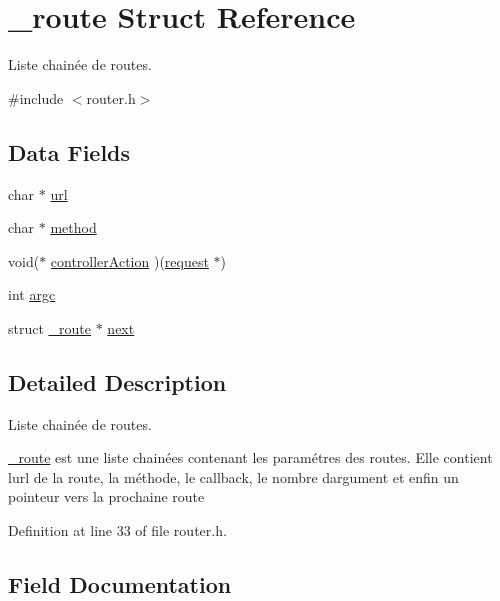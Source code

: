 \hypertarget{struct__route}{}\section{\+\_\+route Struct Reference}
\label{struct__route}


Liste chainée de routes.  




{\ttfamily \#include $<$router.\+h$>$}

\subsection*{Data Fields}
\begin{DoxyCompactItemize}
\item 
char $\ast$ \mbox{\hyperlink{struct__route_ab135e5154c1828bef226a3df98ee3333}{url}}
\item 
char $\ast$ \mbox{\hyperlink{struct__route_aca2544ecce27ac7a7e973d466c3a8fd4}{method}}
\item 
void($\ast$ \mbox{\hyperlink{struct__route_a36cb5ce2683da834da4b34eab0b3c8d5}{controller\+Action}} )(\mbox{\hyperlink{request_8h_a4a26bb67a195367b798ac6ad628c21a2}{request}} $\ast$)
\item 
int \mbox{\hyperlink{struct__route_ad1447518f4372828b8435ae82e48499e}{argc}}
\item 
struct \mbox{\hyperlink{struct__route}{\+\_\+route}} $\ast$ \mbox{\hyperlink{struct__route_ada4cf7708c44661b9a4297823e1633ec}{next}}
\end{DoxyCompactItemize}


\subsection{Detailed Description}
Liste chainée de routes. 

\mbox{\hyperlink{struct__route}{\+\_\+route}} est une liste chainées contenant les paramétres des routes. Elle contient l\textquotesingle{}url de la route, la méthode, le callback, le nombre d\textquotesingle{}argument et enfin un pointeur vers la prochaine route 

Definition at line 33 of file router.\+h.



\subsection{Field Documentation}
\mbox{\label{struct__route_ad1447518f4372828b8435ae82e48499e}} 
